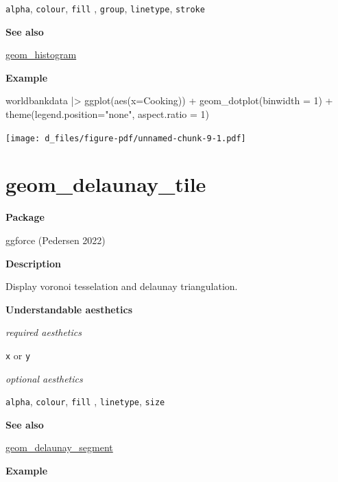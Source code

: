\documentclass[
  letterpaper,
  DIV=11,
  numbers=noendperiod]{scrreprt}
\newenvironment{Shaded}{\begin{snugshade}}{\end{snugshade}}
\newcommand{\AttributeTok}[1]{\textcolor[rgb]{0.40,0.45,0.13}{#1}}
\newcommand{\DecValTok}[1]{\textcolor[rgb]{0.68,0.00,0.00}{#1}}
\newcommand{\FunctionTok}[1]{\textcolor[rgb]{0.28,0.35,0.67}{#1}}
\newcommand{\NormalTok}[1]{\textcolor[rgb]{0.00,0.23,0.31}{#1}}
\newcommand{\SpecialCharTok}[1]{\textcolor[rgb]{0.37,0.37,0.37}{#1}}
\newcommand{\StringTok}[1]{\textcolor[rgb]{0.13,0.47,0.30}{#1}}
\begin{document}
\texttt{alpha}, \texttt{colour}, \texttt{fill} , \texttt{group},
\texttt{linetype}, \texttt{stroke}

\textbf{See also}

\hyperref[hist]{geom\_histogram}

\textbf{Example}

\begin{Shaded}
\begin{Highlighting}[]
\NormalTok{worldbankdata }\SpecialCharTok{|\textgreater{}}
  \FunctionTok{ggplot}\NormalTok{(}\FunctionTok{aes}\NormalTok{(}\AttributeTok{x=}\NormalTok{Cooking)) }\SpecialCharTok{+}   
  \FunctionTok{geom\_dotplot}\NormalTok{(}\AttributeTok{binwidth =} \DecValTok{1}\NormalTok{) }\SpecialCharTok{+} 
  \FunctionTok{theme}\NormalTok{(}\AttributeTok{legend.position=}\StringTok{"none"}\NormalTok{, }\AttributeTok{aspect.ratio =} \DecValTok{1}\NormalTok{)}
\end{Highlighting}
\end{Shaded}

\texttt{[image: d\_files/figure-pdf/unnamed-chunk-9-1.pdf]}

\section{geom\_delaunay\_tile}\label{delaunay_tile}

\textbf{Package}

ggforce (Pedersen 2022)

\textbf{Description}

Display voronoi tesselation and delaunay triangulation.

\textbf{Understandable aesthetics}

\emph{required aesthetics}

\texttt{x} or \texttt{y}

\emph{optional aesthetics}

\texttt{alpha}, \texttt{colour}, \texttt{fill} , \texttt{linetype},
\texttt{size}

\textbf{See also}

\hyperref[delaunay_segment]{geom\_delaunay\_segment}

\textbf{Example}
\end{document}
